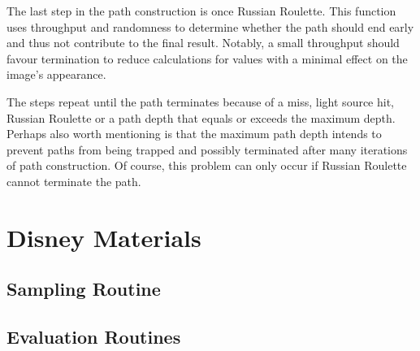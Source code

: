 The last step in the path construction is once Russian Roulette.
This function uses throughput and randomness to determine whether the path should end early and thus not contribute to the final result.
Notably, a small throughput should favour termination to reduce calculations for values with a minimal effect on the image's appearance.

The steps repeat until the path terminates because of a miss, light source hit, Russian Roulette or a path depth that equals or exceeds the maximum depth.
Perhaps also worth mentioning is that the maximum path depth intends to prevent paths from being trapped and possibly terminated after many iterations of path construction.
Of course, this problem can only occur if Russian Roulette cannot terminate the path.

\section{Disney Materials}



\subsection*{Sampling Routine}



\subsection*{Evaluation Routines}



